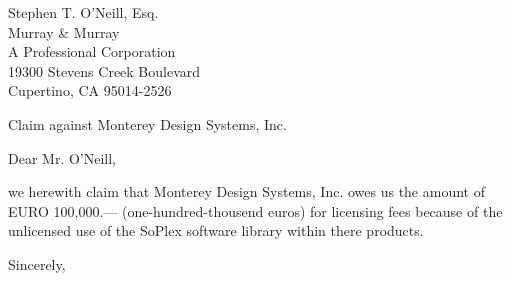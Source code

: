 \documentclass[11pt]{zibletter}
\begin{document}
\begin{letter}{%
Stephen T. O'Neill, Esq.\\
Murray \& Murray\\
A Professional Corporation\\
19300 Stevens Creek Boulevard\\
Cupertino, CA 95014-2526
}
\thispagestyle{empty}
\opening{Claim against Monterey Design Systems, Inc.}

Dear Mr. O'Neill,

we herewith claim that Monterey Design Systems, Inc. owes
us the amount of EURO 100,000.--- (one-hundred-thousend euros) 
for licensing fees because of the 
unlicensed use of the SoPlex software library within there
products. 

\closing{Sincerely,}
\end{letter}
\end{document}
